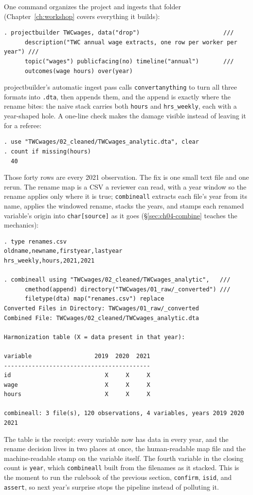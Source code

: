 \documentclass[
    a4paper,
    fontsize=10pt,
    twoside=true,
    numbers=noenddot,
]{kaobook}
\begin{document}
One command organizes the project and ingests that folder (Chapter~\ref{ch:workshop} covers everything it builds):
\par
{\footnotesize
\begin{verbatim}
. projectbuilder TWCwages, data("drop")                        ///
      description("TWC annual wage extracts, one row per worker per year") ///
      topic("wages") publicfacing(no) timeline("annual")       ///
      outcomes(wage hours) over(year)
\end{verbatim}
}
projectbuilder's automatic ingest pass calls \texttt{convertanything} to turn all three formats into \texttt{.dta}, then appends them, and the append is exactly where the rename bites: the naive stack carries both \texttt{hours} and \texttt{hrs\_weekly}, each with a year-shaped hole. A one-line check makes the damage visible instead of leaving it for a referee:
\par
{\footnotesize
\begin{verbatim}
. use "TWCwages/02_cleaned/TWCwages_analytic.dta", clear
. count if missing(hours)
  40
\end{verbatim}
}
Those forty rows are every 2021 observation. The fix is one small text file and one rerun. The rename map is a CSV a reviewer can read, with a year window so the rename applies only where it is true; \texttt{combineall} extracts each file's year from its name, applies the windowed rename, stacks the years, and stamps each renamed variable's origin into \texttt{char[source]} as it goes (\S\ref{sec:ch04-combine} teaches the mechanics):
\par
{\footnotesize
\begin{verbatim}
. type renames.csv
oldname,newname,firstyear,lastyear
hrs_weekly,hours,2021,2021

. combineall using "TWCwages/02_cleaned/TWCwages_analytic",   ///
      cmethod(append) directory("TWCwages/01_raw/_converted") ///
      filetype(dta) map("renames.csv") replace
Converted Files in Directory: TWCwages/01_raw/_converted
Combined File: TWCwages/02_cleaned/TWCwages_analytic.dta

Harmonization table (X = data present in that year):

variable                  2019  2020  2021
------------------------------------------
id                           X     X     X
wage                         X     X     X
hours                        X     X     X

combineall: 3 file(s), 120 observations, 4 variables, years 2019 2020 2021
\end{verbatim}
}
The table is the receipt: every variable now has data in every year, and the rename decision lives in two places at once, the human-readable map file and the machine-readable stamp on the variable itself. The fourth variable in the closing count is \texttt{year}, which \texttt{combineall} built from the filenames as it stacked. This is the moment to run the rulebook of the previous section, \texttt{confirm}, \texttt{isid}, and \texttt{assert}, so next year's surprise stops the pipeline instead of polluting it.
\end{document}
